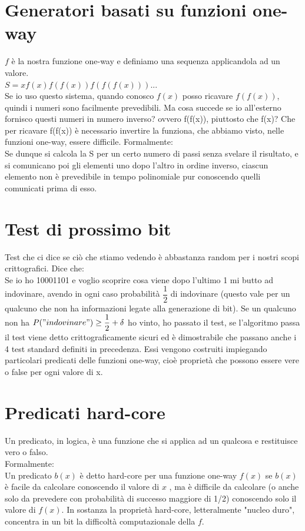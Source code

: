 \section{Generatori basati su funzioni one-way}
$f$ è la nostra funzione one-way e definiamo una sequenza applicandola ad un valore.\\
$S = xf(x)f(f(x))f(f(f(x)))...$\\
Se io uso questo sistema, quando conosco $f(x)$ posso ricavare $f(f(x))$, quindi i numeri sono facilmente prevedibili. Ma cosa succede se io all'esterno fornisco questi numeri in numero inverso? ovvero f(f(x)), piuttosto che f(x)? Che per ricavare f(f(x)) è necessario invertire la funziona, che abbiamo visto, nelle funzioni one-way, essere difficile. Formalmente:\\
Se dunque si calcola la S per un certo numero di passi senza svelare il risultato, e si comunicano poi gli elementi uno dopo l’altro in ordine inverso, ciascun elemento non è prevedibile in tempo polinomiale pur conoscendo quelli comunicati prima di esso.

\newpage

\section{Test di prossimo bit}

Test che ci dice se ciò che stiamo vedendo è abbastanza random per i nostri scopi crittografici. Dice che:\\
Se io ho 10001101 e voglio scoprire cosa viene dopo l'ultimo 1 mi butto ad indovinare, avendo in ogni caso probabilità $\dfrac{1}{2}$ di indovinare (questo vale per un qualcuno che non ha informazioni legate alla generazione di bit). Se un qualcuno non ha $P("indovinare") \geq \dfrac{1}{2} + \delta$ ho vinto, ho passato il test, se l'algoritmo passa il test viene detto crittograficamente sicuri ed è dimostrabile che passano anche i 4 test standard definiti in precedenza. Essi
vengono costruiti impiegando particolari predicati delle funzioni one-way, cioè proprietà che possono essere vere o false per ogni valore di x.

\section{Predicati hard-core}
Un predicato, in logica, è una funzione che si applica ad un qualcosa e restituisce vero o falso.\\
Formalmente:\\
Un predicato $b(x)$ è detto hard-core per una funzione one-way $f(x)$ se $b(x)$ è facile da calcolare conoscendo il valore di $x$ , ma è difficile da calcolare (o anche solo da prevedere con probabilità di successo maggiore di 1/2) conoscendo solo il valore di $f (x)$. In sostanza la proprietà hard-core, letteralmente "nucleo duro", concentra in un bit la difficoltà computazionale della $f$. 
